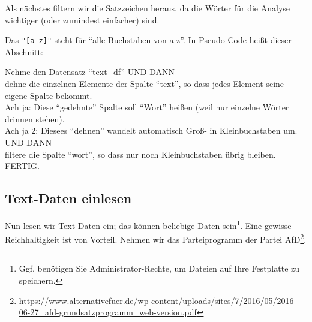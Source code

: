 \documentclass[12pt,]{book}
\newenvironment{Shaded}{\begin{snugshade}}{\end{snugshade}}
\newcommand{\KeywordTok}[1]{\textcolor[rgb]{0.13,0.29,0.53}{\textbf{{#1}}}}
\newcommand{\StringTok}[1]{\textcolor[rgb]{0.31,0.60,0.02}{{#1}}}
\newcommand{\CommentTok}[1]{\textcolor[rgb]{0.56,0.35,0.01}{\textit{{#1}}}}
\newcommand{\NormalTok}[1]{{#1}}
\let\rmarkdownfootnote\footnote%
\def\footnote{\protect\rmarkdownfootnote}
\let\BeginKnitrBlock\begin \let\EndKnitrBlock\end
\begin{document}
Als nächstes filtern wir die Satzzeichen heraus, da die Wörter für die
Analyse wichtiger (oder zumindest einfacher) sind.

\begin{Shaded}
\end{Shaded}

Das \texttt{"{[}a-z{]}"} steht für ``alle Buchstaben von a-z''. In
Pseudo-Code heißt dieser Abschnitt:

\BeginKnitrBlock{rmdpseudocode}
Nehme den Datensatz ``text\_df'' UND DANN\\
dehne die einzelnen Elemente der Spalte ``text'', so dass jedes Element
seine eigene Spalte bekommt.\\
Ach ja: Diese ``gedehnte'' Spalte soll ``Wort'' heißen (weil nur
einzelne Wörter drinnen stehen).\\
Ach ja 2: Diesees ``dehnen'' wandelt automatisch Groß- in
Kleinbuchstaben um. UND DANN\\
filtere die Spalte ``wort'', so dass nur noch Kleinbuchstaben übrig
bleiben. FERTIG.
\EndKnitrBlock{rmdpseudocode}

\subsection{Text-Daten einlesen}\label{text-daten-einlesen}

Nun lesen wir Text-Daten ein; das können beliebige Daten sein\footnote{Ggf.
  benötigen Sie Administrator-Rechte, um Dateien auf Ihre Festplatte zu
  speichern.}. Eine gewisse Reichhaltigkeit ist von Vorteil. Nehmen wir
das Parteiprogramm der Partei AfD\footnote{\url{https://www.alternativefuer.de/wp-content/uploads/sites/7/2016/05/2016-06-27_afd-grundsatzprogramm_web-version.pdf}}.
\end{document}
